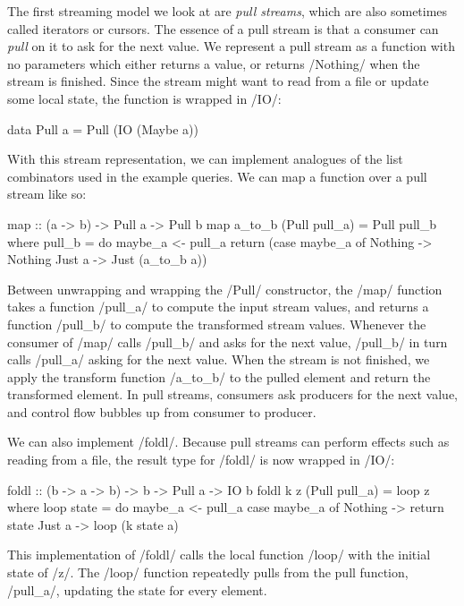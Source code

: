 The first streaming model we look at are \emph{pull streams}, which are also sometimes called iterators or cursors.
The essence of a pull stream is that a consumer can \emph{pull} on it to ask for the next value.
We represent a pull stream as a function with no parameters which either returns a value, or returns \Hs/Nothing/ when the stream is finished.
Since the stream might want to read from a file or update some local state, the function is wrapped in \Hs/IO/:

\begin{haskell}
data Pull a = Pull (IO (Maybe a))
\end{haskell}

With this stream representation, we can implement analogues of the list combinators used in the example queries.
We can map a function over a pull stream like so:

\begin{haskell}
map :: (a -> b) -> Pull a -> Pull b
map a_to_b (Pull pull_a) = Pull pull_b
 where
  pull_b = do
    maybe_a <- pull_a
    return (case maybe_a of
             Nothing -> Nothing
             Just a  -> Just (a_to_b a))
\end{haskell}

Between unwrapping and wrapping the \Hs/Pull/ constructor, the \Hs/map/ function takes a function \Hs/pull_a/ to compute the input stream values, and returns a function \Hs/pull_b/ to compute the transformed stream values.
Whenever the consumer of \Hs/map/ calls \Hs/pull_b/ and asks for the next value, \Hs/pull_b/ in turn calls \Hs/pull_a/ asking for the next value.
When the stream is not finished, we apply the transform function \Hs/a_to_b/ to the pulled element and return the transformed element.
In pull streams, consumers ask producers for the next value, and control flow bubbles up from consumer to producer.

We can also implement \Hs/foldl/.
Because pull streams can perform effects such as reading from a file, the result type for \Hs/foldl/ is now wrapped in \Hs/IO/:

\begin{haskell}
foldl :: (b -> a -> b) -> b -> Pull a -> IO b
foldl k z (Pull pull_a) = loop z
 where
  loop state = do
    maybe_a <- pull_a
    case maybe_a of
      Nothing -> return state
      Just a -> loop (k state a)
\end{haskell}

This implementation of \Hs/foldl/ calls the local function \Hs/loop/ with the initial state of \Hs/z/.
The \Hs/loop/ function repeatedly pulls from the pull function, \Hs/pull_a/, updating the state for every element.


